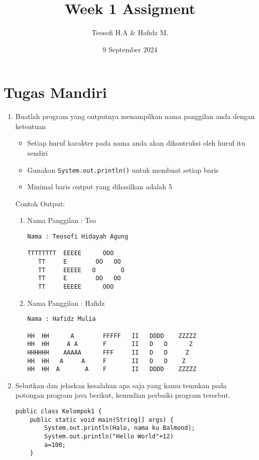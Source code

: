 \documentclass{article}
\title{\textbf{Week 1 Assigment}}
\date{9 September 2024}
\author{Teosofi H.A \& Hafidz M.}
\begin{document}
    \maketitle
    \section*{Tugas Mandiri}
    \begin{enumerate}
        \item Buatlah program yang outputnya menampilkan nama panggilan anda dengan ketentuan
        \begin{itemize}
            \item Setiap huruf karakter pada nama anda akan dikontruksi oleh huruf itu sendiri
            \item Gunakan \texttt{\color{lblue}System.out.println()} untuk membuat setiap baris
            \item Minimal baris output yang dihasilkan adalah 5
        \end{itemize}
        Contoh Output:
        \begin{enumerate}[label=(\arabic*)]
            \item Nama Panggilan : Teo
            \begin{lstlisting}[style=output]
Nama : Teosofi Hidayah Agung

TTTTTTTT  EEEEE      OOO  
   TT     E        OO   OO
   TT     EEEEE   O       O
   TT     E        OO   OO
   TT     EEEEE      OOO
            \end{lstlisting}
            \item Nama Panggilan : Hafidz
            \begin{lstlisting}[style=output]
Nama : Hafidz Mulia

HH  HH      A        FFFFF   II   DDDD    ZZZZZ
HH  HH     A A       F       II   D   D      Z
HHHHHH    AAAAA      FFF     II   D   D     Z
HH  HH   A     A     F       II   D   D    Z
HH  HH  A       A    F       II   DDDD    ZZZZZ
            \end{lstlisting}
        \end{enumerate}
        
        
        \item Sebutkan dan jelaskan kesalahan apa saja yang kamu temukan pada potongan program java berikut, kemudian perbaiki program tersebut.
        \begin{lstlisting}[style=standard]
public class Kelompok1 {
    public static void main(String[] args) {
        System.out.println(Halo, nama ku Balmond);
        System.out.println("Hello World"+12)
        a=100;
    }
        \end{lstlisting}

    \end{enumerate}
\end{document}
